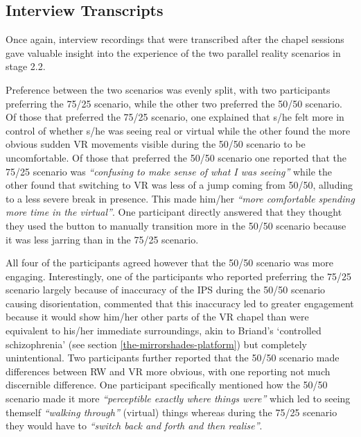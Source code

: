
\subsection{Interview Transcripts}

Once again, interview recordings that were transcribed after the chapel sessions gave valuable insight into the experience of the two parallel reality scenarios in stage 2.2.

Preference between the two scenarios was evenly split, with two participants preferring the 75/25 scenario, while the other two preferred the 50/50 scenario. Of those that preferred the 75/25 scenario, one explained that s/he felt more in control of whether s/he was seeing real or virtual while the other found the more obvious sudden VR movements visible during the 50/50 scenario to be uncomfortable. Of those that preferred the 50/50 scenario one reported that the 75/25 scenario was \textit{``confusing to make sense of what I was seeing''} while the other found that switching to VR was less of a jump coming from 50/50, alluding to a less severe break in presence. This made him/her \textit{``more comfortable spending more time in the virtual''}. One participant directly answered that they thought they used the button to manually transition more in the 50/50 scenario because it was less jarring than in the 75/25 scenario.

All four of the participants agreed however that the 50/50 scenario was more engaging. Interestingly, one of the participants who reported preferring the 75/25 scenario largely because of inaccuracy of the IPS during the 50/50 scenario causing disorientation, commented that this inaccuracy led to greater engagement because it would show him/her other parts of the VR chapel than were equivalent to his/her immediate surroundings, akin to Briand's `controlled schizophrenia' (see section \ref{the-mirrorshades-platform}) but completely unintentional. Two participants further reported that the 50/50 scenario made differences between RW and VR more obvious, with one reporting not much discernible difference. One participant specifically mentioned how the 50/50 scenario made it more \textit{``perceptible exactly where things were''} which led to seeing themself \textit{``walking through''} (virtual) things whereas during the 75/25 scenario they would have to \textit{``switch back and forth and then realise''}.

